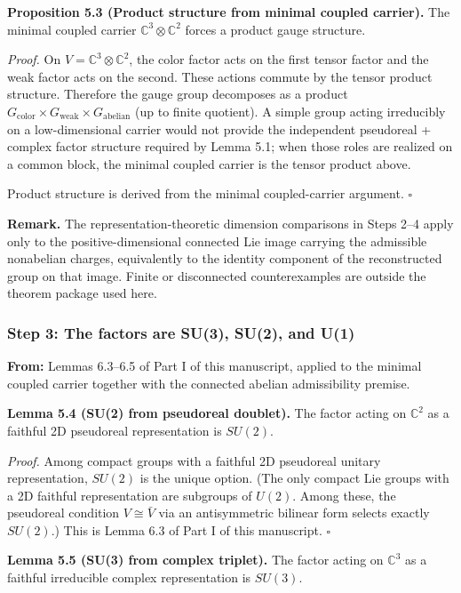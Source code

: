 \textbf{Proposition 5.3 (Product structure from minimal coupled carrier).} The minimal coupled carrier \(\mathbb{C}^3 \otimes \mathbb{C}^2\) forces a product gauge structure.

\emph{Proof.} On \(V = \mathbb{C}^3 \otimes \mathbb{C}^2\), the color factor acts on the first tensor factor and the weak factor acts on the second. These actions commute by the tensor product structure. Therefore the gauge group decomposes as a product \(G_{\mathrm{color}} \times G_{\mathrm{weak}} \times G_{\mathrm{abelian}}\) (up to finite quotient). A simple group acting irreducibly on a low-dimensional carrier would not provide the independent pseudoreal + complex factor structure required by Lemma 5.1; when those roles are realized on a common block, the minimal coupled carrier is the tensor product above.

Product structure is derived from the minimal coupled-carrier argument. \(\square\)

\textbf{Remark.} The representation-theoretic dimension comparisons in Steps 2--4 apply only to the positive-dimensional connected Lie image carrying the admissible nonabelian charges, equivalently to the identity component of the reconstructed group on that image. Finite or disconnected counterexamples are outside the theorem package used here.

\subsubsection{Step 3: The factors are SU(3), SU(2), and U(1)}\label{step-3-the-factors-are-su3-su2-and-u1}

\textbf{From:} Lemmas 6.3--6.5 of Part I of this manuscript, applied to the minimal coupled carrier together with the connected abelian admissibility premise.

\textbf{Lemma 5.4 (SU(2) from pseudoreal doublet).} The factor acting on \(\mathbb{C}^2\) as a faithful 2D pseudoreal representation is \(SU(2)\).

\emph{Proof.} Among compact groups with a faithful 2D pseudoreal unitary representation, \(SU(2)\) is the unique option. (The only compact Lie groups with a 2D faithful representation are subgroups of \(U(2)\). Among these, the pseudoreal condition \(V \cong \bar{V}\) via an antisymmetric bilinear form selects exactly \(SU(2)\).) This is Lemma 6.3 of Part I of this manuscript. \(\square\)

\textbf{Lemma 5.5 (SU(3) from complex triplet).} The factor acting on \(\mathbb{C}^3\) as a faithful irreducible complex representation is \(SU(3)\).

